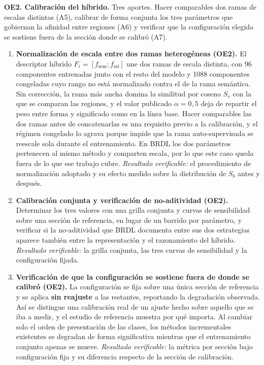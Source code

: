 \medskip
\noindent\textbf{OE2. Calibración del híbrido.} Tres aportes. Hacer comparables
dos ramas de escalas distintas (A5), calibrar de forma conjunta los tres
parámetros que gobiernan la afinidad entre regiones (A6) y verificar que la
configuración elegida se sostiene fuera de la sección donde se calibró (A7).

\begin{enumerate}
\item[\textbf{A5}] \textbf{Normalización de escala entre dos ramas heterogéneas
(OE2).} El descriptor híbrido $F_i=[f_{\mathrm{sem}};f_{\mathrm{ssl}}]$ une dos
ramas de escala distinta, con 96 componentes entrenadas junto con el resto del
modelo y 1088 componentes congeladas cuyo rango no está normalizado contra el de
la rama semántica. Sin corrección, la rama más ancha domina la similitud por
coseno $S_s$ con la que se comparan las regiones, y el valor publicado
$\alpha=0{,}5$ deja de repartir el peso entre forma y significado como en la
línea base. Hacer comparables las dos ramas antes de concatenarlas es una
requisito previo a la calibración, y el régimen
congelado lo agrava porque impide que la rama auto-supervisada se reescale sola
durante el entrenamiento. En BRDL los dos parámetros pertenecen al mismo método
y comparten escala, por lo que este caso queda fuera de lo que ese trabajo
cubre. \emph{Resultado verificable:} el procedimiento de normalización adoptado
y su efecto medido sobre la distribución de $S_b$ antes y después.

\item[\textbf{A6}] \textbf{Calibración conjunta y verificación de
no-aditividad (OE2).} Determinar los tres valores con una grilla
conjunta y curvas de sensibilidad sobre una sección de referencia, en lugar de un
barrido por parámetro, y verificar si la no-aditividad que BRDL documenta entre
sus dos estrategias aparece también entre la representación y el razonamiento del
híbrido. \emph{Resultado verificable:} la grilla conjunta, las tres curvas de
sensibilidad y la configuración fijada.

\item[\textbf{A7}] \textbf{Verificación de que la configuración se sostiene fuera
de donde se calibró (OE2).} La configuración se fija sobre una única sección de
referencia y se aplica \textbf{sin reajuste} a las restantes, reportando
la degradación observada. Así se distingue una calibración real de un ajuste hecho
sobre aquello que se iba a medir, y el estudio de referencia muestra por qué
importa. Al cambiar solo el orden de presentación de las clases, los métodos
incrementales existentes se degradan de forma significativa mientras que el
entrenamiento conjunto apenas se mueve. \emph{Resultado verificable:} la métrica
por sección bajo configuración fija y su diferencia respecto de la sección de
calibración.
\end{enumerate}

